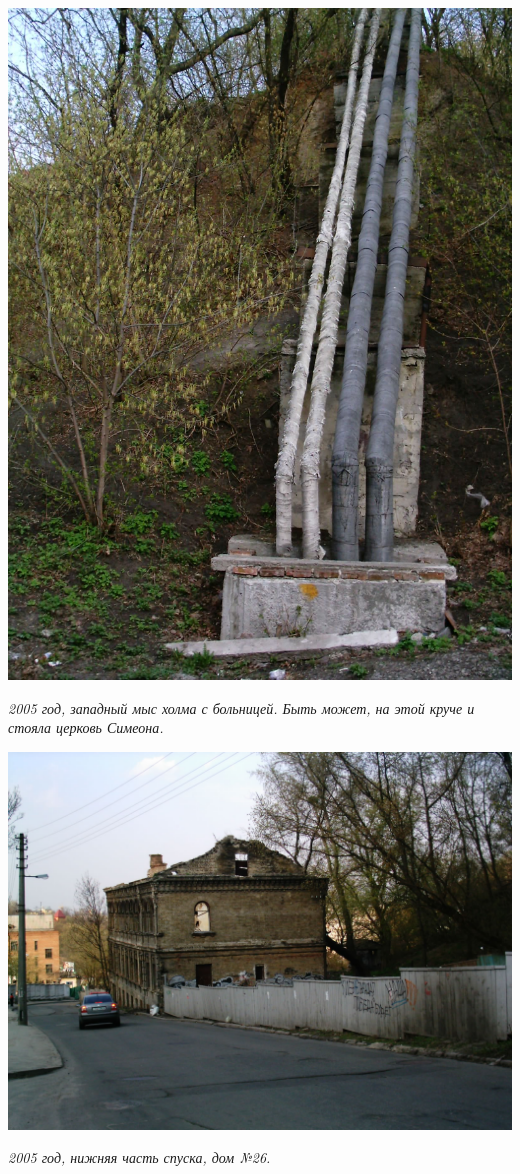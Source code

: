 \newpage
\vspace*{\fill}
\begin{center}
\includegraphics[width=\linewidth]{chast-colebanie-osnov/gora-zamkovaya-valovaya/imag0021.jpg}

\textit{2005 год, западный мыс холма с больницей.
Быть может, на этой круче и стояла церковь Симеона.}
\end{center}
\vspace*{\fill}
\newpage

\begin{center}
\includegraphics[width=\linewidth]{chast-colebanie-osnov/gora-zamkovaya-valovaya/imag0022.jpg}

\textit{2005 год, нижняя часть спуска, дом №26.}
\end{center}

